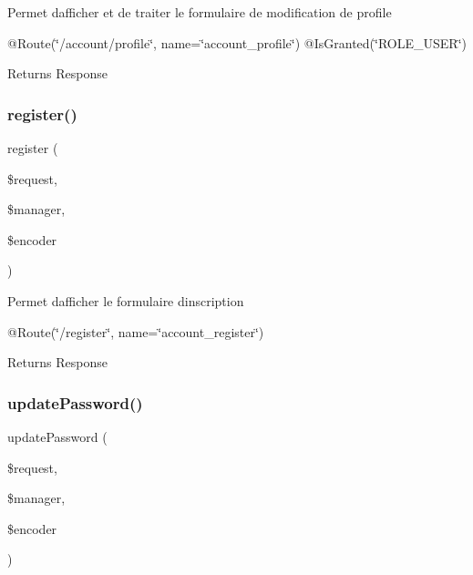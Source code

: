 Permet d\textquotesingle{}afficher et de traiter le formulaire de modification de profile

@\+Route(\char`\"{}/account/profile\char`\"{}, name=\char`\"{}account\+\_\+profile\char`\"{}) @\+Is\+Granted(\char`\"{}\+R\+O\+L\+E\+\_\+\+U\+S\+E\+R\char`\"{})

\begin{DoxyReturn}{Returns}
Response 
\end{DoxyReturn}
\mbox{\label{class_app_1_1_controller_1_1_account_controller_a90ecc2d541bdc4c5178f2d0bb48899e5}} 
\subsubsection{\texorpdfstring{register()}{register()}}
{\footnotesize\ttfamily register (\begin{DoxyParamCaption}\item[{Request}]{\$request,  }\item[{Object\+Manager}]{\$manager,  }\item[{User\+Password\+Encoder\+Interface}]{\$encoder }\end{DoxyParamCaption})}

Permet d\textquotesingle{}afficher le formulaire d\textquotesingle{}inscription

@\+Route(\char`\"{}/register\char`\"{}, name=\char`\"{}account\+\_\+register\char`\"{})

\begin{DoxyReturn}{Returns}
Response 
\end{DoxyReturn}
\mbox{\label{class_app_1_1_controller_1_1_account_controller_a359d94aeff6cd7be80cd365c9300bd37}} 
\subsubsection{\texorpdfstring{updatePassword()}{updatePassword()}}
{\footnotesize\ttfamily update\+Password (\begin{DoxyParamCaption}\item[{Request}]{\$request,  }\item[{Object\+Manager}]{\$manager,  }\item[{User\+Password\+Encoder\+Interface}]{\$encoder }\end{DoxyParamCaption})}


